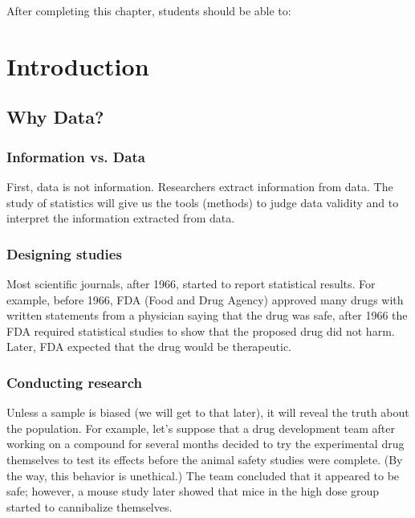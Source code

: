 \documentclass[11pt, chapterprefix=true]{scrbook}\usepackage[]{graphicx}\usepackage[]{color}
\begin{document}
After completing this chapter, students should be able to:


\section{Introduction}

\subsection{Why Data?}

\subsubsection{Information vs. Data}

First, data is not information.  Researchers extract information from data.  The study of statistics will give us the tools (methods) to judge data validity and to interpret the information extracted from data.

\subsubsection{Designing studies}

Most scientific journals, after 1966, started to report statistical results.  For example, before 1966, FDA (Food and Drug Agency) approved many drugs with written statements from a physician saying that the drug was safe, after 1966 the FDA required statistical studies to show that the proposed drug did not harm.  Later, FDA expected that the drug would be therapeutic.

\subsubsection{Conducting research}

Unless a sample is biased (we will get to that later), it will reveal the truth about the population.  For example, let's suppose that a drug development team after working on a compound for several months decided to try the experimental drug themselves to test its effects before the animal safety studies were complete.  (By the way, this behavior is unethical.)  The team concluded that it appeared to be safe; however, a mouse study later showed that mice in the high dose group started to cannibalize themselves.   
\end{document}
